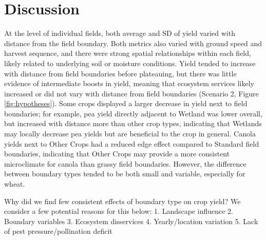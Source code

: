 \documentclass[]{elsarticle} %
\begin{document}
\hypertarget{discussion}{%
\section{Discussion}\label{discussion}}

At the level of individual fields, both average and SD of yield varied with distance from the field boundary.
Both metrics also varied with ground speed and harvest sequence, and there were strong spatial relationships within each field, likely related to underlying soil or moisture conditions.
Yield tended to increase with distance from field boundaries before plateauing, but there was little evidence of intermediate boosts in yield, meaning that ecosystem services likely increased or did not vary with distance from field boundaries (Scenario 2, Figure \ref{fig:hypotheses}).
Some crops displayed a larger decrease in yield next to field boundaries; for example, pea yield directly adjacent to Wetland was lower overall, but increased with distance more than other crop types, indicating that Wetlands may locally decrease pea yields but are beneficial to the crop in general.
Canola yields next to Other Crops had a reduced edge effect compared to Standard field boundaries, indicating that Other Crops may provide a more consistent microclimate for canola than grassy field boundaries.
However, the difference between boundary types tended to be both small and variable, especially for wheat.

Why did we find few consistent effects of boundary type on crop yield?
We consider a few potential reasons for this below:
1. Landscape influence
2. Boundary variables
3. Ecosystem disservices
4. Yearly/location variation
5. Lack of pest pressure/pollination deficit
\end{document}

